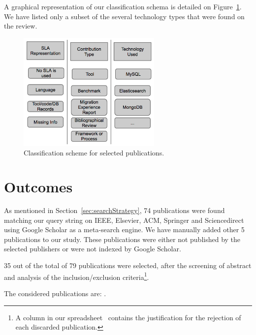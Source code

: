 \documentclass[conference, 10pt, a4paper]{IEEEtran}
\begin{document}
A graphical representation of our classification schema is detailed on Figure~\ref{fig:classificationSchema}. We have listed only a subset of the several technology types that were found on the review.

\begin{figure}
\centering
\includegraphics[width=70mm]{classificationSchema.png}
\caption{Classification scheme for selected publications. \label{fig:classificationSchema}}
\end{figure}

\section{Outcomes}
\label{sec:outcomes}

As mentioned in Section~\ref{sec:searchStrategy}, 74 publications were found matching our query string on IEEE, Elsevier, ACM, Springer and Sciencedirect using Google Scholar as a meta-search engine. We have manually added other 5 publications to our study. These publications were either not published by the selected publishers or were not indexed by Google Scholar. 

35 out of the total of 79 publications were selected, after the screening of abstract and analysis of the inclusion/exclusion criteria\footnote{A column in our spreadsheet~\cite{systematicMappingSpreadsheet} contains the justification for the rejection of each discarded publication.}.

The considered publications are: \cite{6665220} \cite{6253526}  \cite{6461875} \cite{6597164} \cite{6616442} \cite{Xiong:2012:DMR:2213598.2213614} \cite{Alomari:2014:CFD:2684200.2684324} \cite{6632740} \cite{6253597} \cite{cloudhosteddatabases} \cite{6655733} \cite{192837618237651293} \cite{6616442} \cite{designinganddevelopment} \cite{5959767} \cite{Petcu20131417} \cite{Giannikis:2013:WOU:2463676.2463678} \cite{1236781237} \cite{6280329} \cite{6681233} \cite{Xiong:2011:APA:2038916.2038931} \cite{7037676} \cite{7017947} \cite{Qiao:2013:BFE:2463676.2465298} \cite{5742778} \cite{Montes20132026} \cite{Elmore:2013:CTB:2463676.2465308} \cite{12789361729836} \cite{6842585} \cite{Shue:2014:ARV:2592798.2592823} \cite{Schram:2012:MND:2384716.2384773} \cite{buazuartransition} \cite{gomez2014building} \cite{6546068} \cite{6846456}.
\end{document}
